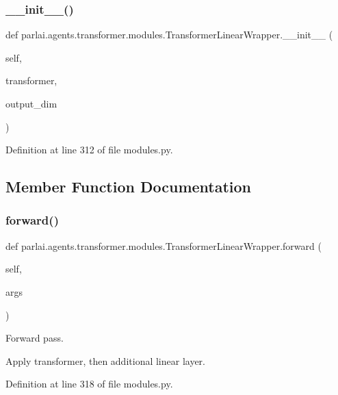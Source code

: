 \subsubsection{\texorpdfstring{\+\_\+\+\_\+init\+\_\+\+\_\+()}{\_\_init\_\_()}}
{\footnotesize\ttfamily def parlai.\+agents.\+transformer.\+modules.\+Transformer\+Linear\+Wrapper.\+\_\+\+\_\+init\+\_\+\+\_\+ (\begin{DoxyParamCaption}\item[{}]{self,  }\item[{}]{transformer,  }\item[{}]{output\+\_\+dim }\end{DoxyParamCaption})}



Definition at line 312 of file modules.\+py.



\subsection{Member Function Documentation}
\mbox{\label{classparlai_1_1agents_1_1transformer_1_1modules_1_1TransformerLinearWrapper_a82f571e85719bde36f8fcf09f27d3e4c}} 
\subsubsection{\texorpdfstring{forward()}{forward()}}
{\footnotesize\ttfamily def parlai.\+agents.\+transformer.\+modules.\+Transformer\+Linear\+Wrapper.\+forward (\begin{DoxyParamCaption}\item[{}]{self,  }\item[{}]{args }\end{DoxyParamCaption})}

\begin{DoxyVerb}Forward pass.

Apply transformer, then additional linear layer.
\end{DoxyVerb}
 

Definition at line 318 of file modules.\+py.



